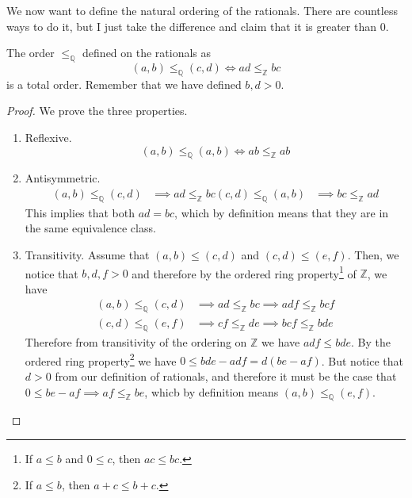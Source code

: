 \documentclass{article}
\begin{document}
      We now want to define the natural ordering of the rationals. There are countless ways to do it, but I just take the difference and claim that it is greater than $0$. 

      \begin{theorem}
        The order $\leq_{\mathbb{Q}}$ defined on the rationals as 
        \begin{equation}
          (a, b) \leq_{\mathbb{Q}} (c, d) \iff ad \leq_{\mathbb{Z}} bc
        \end{equation}
        is a total order. Remember that we have defined $b, d > 0$. 
      \end{theorem}
      \begin{proof}
        We prove the three properties. 
        \begin{enumerate}
          \item Reflexive. 
          \begin{equation}
            (a, b) \leq_{\mathbb{Q}} (a, b) \iff ab \leq_{\mathbb{Z}} ab
          \end{equation} 

          \item Antisymmetric. 
          \begin{align}
            (a, b) \leq_{\mathbb{Q}} (c, d) & \implies ad \leq_{\mathbb{Z}} bc
            (c, d) \leq_{\mathbb{Q}} (a, b) & \implies bc \leq_{\mathbb{Z}} ad
          \end{align} 
          This implies that both $ad = bc$, which by definition means that they are in the same equivalence class. 

          \item Transitivity. Assume that $(a, b) \leq (c, d)$ and $(c, d) \leq (e, f)$. Then, we notice that $b, d, f > 0$ and therefore by the ordered ring property\footnote{If $a \leq b$ and $0 \leq c$, then $ac \leq bc$.} of $\mathbb{Z}$, we have 
          \begin{align}
            (a, b) \leq_{\mathbb{Q}} (c, d) & \implies ad \leq_{\mathbb{Z}} bc \implies adf \leq_{\mathbb{Z}} bcf \\ 
            (c, d) \leq_{\mathbb{Q}} (e, f) & \implies cf \leq_{\mathbb{Z}} de \implies bcf \leq_{\mathbb{Z}} bde
          \end{align}
          Therefore from transitivity of the ordering on $\mathbb{Z}$ we have $adf \leq bde$. By the ordered ring property\footnote{If $a \leq b$, then $a + c \leq b + c$.}  we have $0 \leq bde - adf = d(be - af)$. But notice that $d > 0$ from our definition of rationals, and therefore it must be the case that $0 \leq be - af \implies af \leq_{\mathbb{Z}} be$, whicb by definition means $(a, b) \leq_{\mathbb{Q}} (e, f)$. 
        \end{enumerate}
      \end{proof} 
\end{document}
